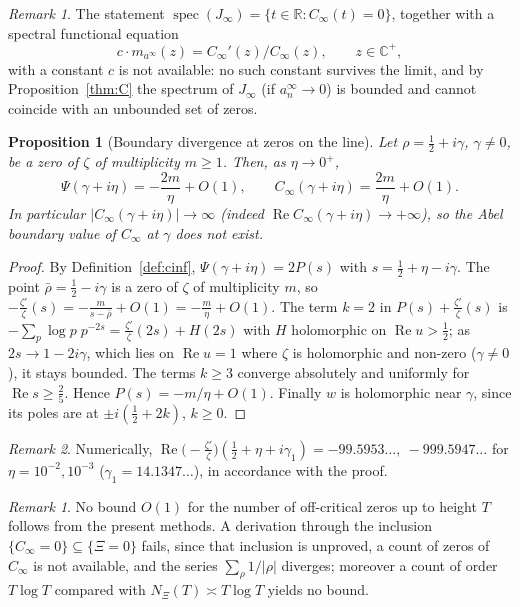 \documentclass[11pt]{amsart}
\newtheorem{proposition}[theorem]{Proposition}
\theoremstyle{definition}
\theoremstyle{remark}
\newtheorem{remark}[theorem]{Remark}
\newtheorem*{remark*}{Remark}
\renewcommand{\Re}{\operatorname{Re}}
\newcommand{\half}{\tfrac12}
\newcommand{\Cinf}{C_\infty}
\newcommand{\Jinf}{J_\infty}
\DeclareMathOperator{\spec}{spec}
\begin{document}
\begin{remark*}
The statement $\spec(\Jinf)=\{t\in\mathbb R:\Cinf(t)=0\}$, together with a spectral functional
equation
\[
\textstyle c\cdot m_{a^\infty}(z)=\Cinf'(z)/\Cinf(z),\qquad z\in\mathbb C^+,
\tag{EF2}
\]
with a constant $c$ is not available: no such constant survives the limit, and by Proposition~\ref{thm:C} the
spectrum of $\Jinf$ (if $a_n^\infty\to0$) is bounded and cannot coincide with an unbounded set
of zeros.
\end{remark*}

\begin{proposition}[Boundary divergence at zeros on the line]\label{thm:B}
Let $\rho=\half+i\gamma$, $\gamma\ne0$, be a zero of $\zeta$ of multiplicity $m\ge1$. Then, as
$\eta\to0^+$,
\[
\Psi(\gamma+i\eta)=-\frac{2m}{\eta}+O(1),\qquad
\Cinf(\gamma+i\eta)=\frac{2m}{\eta}+O(1).
\]
In particular $|\Cinf(\gamma+i\eta)|\to\infty$ (indeed $\Re\Cinf(\gamma+i\eta)\to+\infty$), so
the Abel boundary value of $\Cinf$ at $\gamma$ does not exist.
\end{proposition}
\begin{proof}
By Definition~\ref{def:cinf}, $\Psi(\gamma+i\eta)=2P(s)$ with $s=\half+\eta-i\gamma$. The point
$\bar\rho=\half-i\gamma$ is a zero of $\zeta$ of multiplicity $m$, so
$-\frac{\zeta'}{\zeta}(s)=-\frac m{s-\bar\rho}+O(1)=-\frac m\eta+O(1)$. The term $k=2$ in
$P(s)+\frac{\zeta'}{\zeta}(s)$ is $-\sum_p\log p\;p^{-2s}=\frac{\zeta'}{\zeta}(2s)+H(2s)$ with
$H$ holomorphic on $\Re u>\half$; as $2s\to1-2i\gamma$, which lies on $\Re u=1$ where $\zeta$
is holomorphic and non-zero ($\gamma\ne0$), it stays bounded. The terms $k\ge3$ converge
absolutely and uniformly for $\Re s\ge\frac25$. Hence $P(s)=-m/\eta+O(1)$. Finally $w$ is
holomorphic near $\gamma$, since its poles are at $\pm i(\half+2k)$, $k\ge0$.
\end{proof}

\begin{remark*}
Numerically, $\Re\big(-\frac{\zeta'}{\zeta}\big)(\half+\eta+i\gamma_1)=-99.5953\ldots,\ -999.5947\ldots$ for $\eta=10^{-2},10^{-3}$ ($\gamma_1=14.1347\ldots$), in accordance with the
proof.
\end{remark*}

\begin{remark}\label{cor:few}
No bound $O(1)$ for the number of off-critical zeros up to height $T$ follows from the present
methods. A derivation through the inclusion $\{\Cinf=0\}\subseteq\{\Xi=0\}$ fails, since that
inclusion is unproved, a count of zeros of $\Cinf$ is not
available, and the series $\sum_\rho1/|\rho|$ diverges; moreover a count of order $T\log T$
compared with $N_\Xi(T)\asymp T\log T$ yields no bound.
\end{remark}
\end{document}
